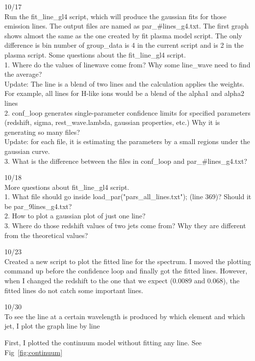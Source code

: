 10/17\\
Run the fit\_line\_gl4 script, which will produce the gaussian fits for those emission lines. The output files are named as par\_\#lines\_g4.txt. 
The first graph shows almost the same as the one created by fit plasma model script. The only difference is bin number of group\_data is 4 in the current script and is 2 in the plasma script.
Some questions about the fit\_line\_gl4 script.\\
1. Where do the values of line\-wave come from?  Why some line\_wave need to find the average?\\
Update: The line is a blend of two lines and the calculation applies the weights. For example, all lines for H-like ions would be a blend of the alpha1 and alpha2 lines\\
2. conf\_loop generates single-parameter confidence limits for specified parameters (redshift, sigma, rest\_wave.lambda, gaussian properties, etc.) Why it is generating so many files?\\
Update: for each file, it is estimating the parameters by a small regions under the gaussian curve.\\ 
3. What is the difference between the files in conf\_loop and par\_\#lines\_g4.txt?

10/18\\
More questions about fit\_line\_gl4 script.\\
1. What file should go inside load\_par("pars\_all\_lines.txt"); (line 369)? Should it be par\_9lines\_g4.txt?\\
2. How to plot a gaussian plot of just one line?\\
3. Where do those redshift values of two jets come from? Why they are different from the theoretical values? 


10/23\\
Created a new script to plot the fitted line for the spectrum. I moved the plotting command up before the confidence loop and finally got the fitted lines. However, when I changed the redshift to the one that we expect (0.0089 and 0.068), the fitted lines do not catch some important lines. 

10/30\\
To see the line at a certain wavelength is produced by which element and which jet, I plot the graph line by line

First, I plotted the continuum model without fitting any line. See Fig~\ref{fig:continuum}

